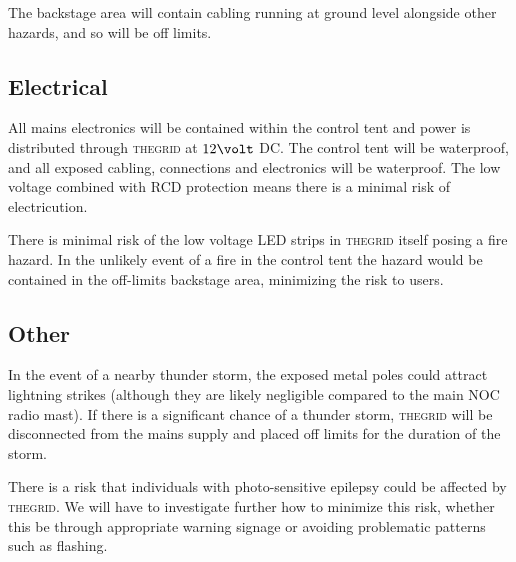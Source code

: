 \documentclass[12pt]{article} %
\newcommand{\thegrid}{\textsc{the\textperiodcentered grid}\xspace}
\begin{document}
The backstage area will contain cabling running at ground level alongside other hazards, and so will be off limits.

\subsection{Electrical}
All mains electronics will be contained within the control tent and power is distributed through \thegrid at $12\volt$ DC.  The control tent will be waterproof, and all exposed cabling, connections and electronics will be waterproof.  The low voltage combined with RCD protection means there is a minimal risk of electricution.

There is minimal risk of the low voltage LED strips in \thegrid itself posing a fire hazard.  In the unlikely event of a fire in the control tent the hazard would be contained in the off-limits backstage area, minimizing the risk to users.

\subsection{Other}
In the event of a nearby thunder storm, the exposed metal poles could attract lightning strikes (although they are likely negligible compared to the main NOC radio mast).  If there is a significant chance of a thunder storm, \thegrid will be disconnected from the mains supply and placed off limits for the duration of the storm.

There is a risk that individuals with photo-sensitive epilepsy could be affected by \thegrid.  We will have to investigate further how to minimize this risk, whether this be through appropriate warning signage or avoiding problematic patterns such as flashing.
\end{document}
